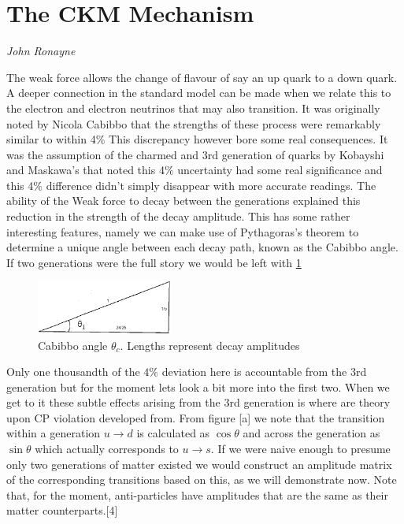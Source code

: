 %
\section{The CKM Mechanism}
\vspace{-1.0em}
\begin{center}
\tiny{\textit{John Ronayne}}
\end{center}


The weak force allows the change of flavour of say an up quark to a down quark. A deeper connection in the standard model can be made when we relate this to the electron and electron neutrinos that may also transition. It was originally noted by Nicola Cabibbo that the strengths of these process were remarkably similar to within 4$\%$ This discrepancy however bore some real consequences. It was the assumption of the charmed and 3rd generation of quarks by Kobayshi and Maskawa’s that noted this 4$\%$ uncertainty had some real significance and this 4$\%$ difference didn't simply disappear with more accurate readings. The ability of the Weak force to decay between the generations explained this reduction in the strength of the decay amplitude. This has some rather interesting features, namely we can make use of Pythagoras's theorem to determine a unique angle between each decay path, known as the Cabibbo angle. If two generations were the full story we would be left with \cref{cabibbo}

\begin{figure}[h]
\centering
\includegraphics[width=0.4\textwidth]{figs/ckmfig1.jpg}
\caption{Cabibbo angle $\theta_c$. Lengths represent decay amplitudes}
\label{cabibbo}
\end{figure}


Only one thousandth of the $4\%$ deviation here is accountable from the 3rd generation but for the moment lets look a bit more into the first two.
When we get to it these subtle effects arising from the 3rd generation is where are theory upon CP violation developed from. From figure [a] we note that the transition within a generation $u\rightarrow d$ is calculated as $\cos\theta$ and across the generation as $\sin\theta$ which actually corresponds to $u\rightarrow s$. If we were naive enough to presume only two generations of matter existed we would construct an amplitude matrix of the corresponding transitions based on this, as we will demonstrate now. Note that, for the moment, anti-particles have amplitudes that are the same as their matter counterparts.[4]

